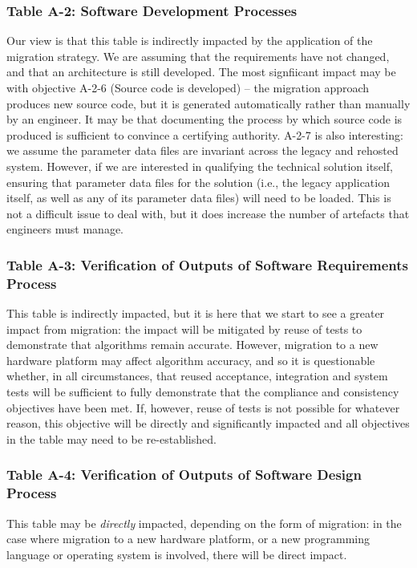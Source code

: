 \documentclass{llncs}
\begin{document}
\subsubsection{Table A-2: Software Development Processes}
Our view is that this table is indirectly impacted by the application of the migration strategy. We are assuming that the requirements have not changed, and that an architecture is still developed. The most signfiicant impact may be with objective A-2-6 (Source code is developed) -- the migration approach produces new source code, but it is generated automatically rather than manually by an engineer. It may be that documenting the process by which source code is produced is sufficient to convince a certifying authority. A-2-7 is also interesting: we assume the parameter data files are invariant across the legacy and rehosted system. However, if we are interested in qualifying the technical solution itself, ensuring that parameter data files for the solution (i.e., the legacy application itself, as well as any of its parameter data files) will need to be loaded. This is not a difficult issue to deal with, but it does increase the number of artefacts that engineers must manage.

\subsubsection{Table A-3: Verification of Outputs of Software Requirements Process}
This table is indirectly impacted, but it is here that we start to see a greater impact from migration: the impact will be mitigated by reuse of tests to demonstrate that algorithms remain accurate. However, migration to a new hardware platform may affect algorithm accuracy, and so it is questionable whether, in all circumstances, that reused acceptance, integration and system tests will be sufficient to fully demonstrate that the compliance and consistency objectives have been met. If, however, reuse of tests is not possible for whatever reason, this objective will be directly and significantly impacted and all objectives in the table may need to be re-established.

\subsubsection{Table A-4: Verification of Outputs of Software Design Process}
This table may be \textit{directly} impacted, depending on the form of migration: in the case where migration to a new hardware platform, or a new programming language or operating system is involved, there will be direct impact. 
\end{document}
